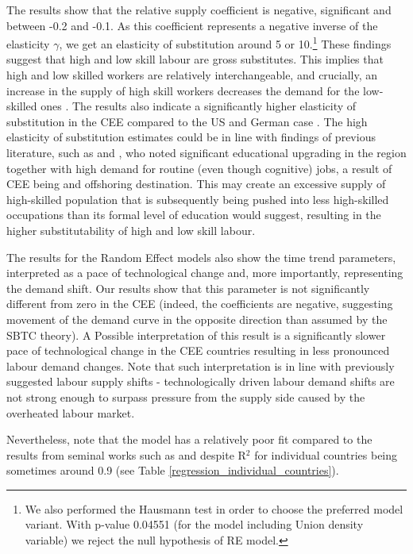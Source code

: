 \documentclass[11pt]{article}
\begin{document}
The results show that the relative supply coefficient is negative, significant and between -0.2 and -0.1. As this coefficient represents a negative inverse of the elasticity $\gamma$, we get an elasticity of substitution around 5 or 10.\footnote{We also performed the Hausmann test in order to choose the preferred model variant. With p-value 0.04551 (for the model including Union density variable) we reject the null hypothesis of RE model.} These findings suggest that high and low skill labour are gross substitutes. This implies that high and low skilled workers are relatively interchangeable, and crucially, an increase in the supply of high skill workers decreases the demand for the low-skilled ones \citep{havranek2020elasticity}. The results also indicate a significantly higher elasticity of substitution in the CEE compared to the US and German case \citep{acemoglu2012does, glitz2021skill}. The high elasticity of substitution estimates could be in line with findings of previous literature, such as \citet{arendt2019technical} and \citet{hardy2018educational}, who noted significant educational upgrading in the region together with high demand for routine (even though cognitive) jobs, a result of CEE being and offshoring destination. This may create an excessive supply of high-skilled population that is subsequently being pushed into less high-skilled occupations than its formal level of education would suggest, resulting in the higher substitutability of high and low skill labour.

The results for the Random Effect models also show the time trend parameters, interpreted as a pace of technological change and, more importantly, representing the demand shift. Our results show that this parameter is not significantly different from zero in the CEE (indeed, the coefficients are negative, suggesting movement of the demand curve in the opposite direction than assumed by the SBTC theory). A Possible interpretation of this result is a significantly slower pace of technological change in the CEE countries resulting in less pronounced labour demand changes. Note that such interpretation is in line with previously suggested labour supply shifts - technologically driven labour demand shifts are not strong enough to surpass pressure from the supply side caused by the overheated labour market.

Nevertheless, note that the model has a relatively poor fit compared to the results from seminal works such as \citet{katz1992changes} and \citet{glitz2021skill} despite R$^{2}$ for individual countries being sometimes around 0.9 (see Table \ref{regression_individual_countries}).
\end{document}
